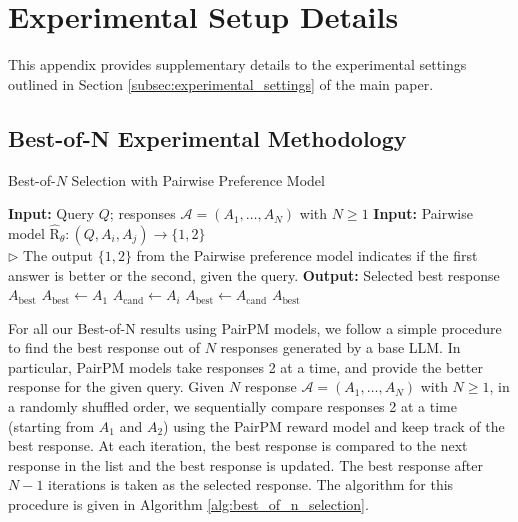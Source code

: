 \clearpage
\section{Experimental Setup Details}
\label{sec:experimental_details}

This appendix provides supplementary details to the experimental settings outlined in Section \ref{subsec:experimental_settings} of the main paper.

\subsection{Best-of-N Experimental Methodology}
\label{ssec:bon_pairpm_expt_methodology}

\begin{algorithm}[H]
  \caption{Best-of-$N$ Selection with Pairwise Preference Model}
  \label{alg:best_of_n_selection}
  \begin{algorithmic}[1]          %
    \STATE \textbf{Input:}  Query $Q$; responses $\mathcal{A} = (A_1,\dots,A_N)$ with $N \ge 1$
    \STATE \textbf{Input:}  Pairwise model $\hat{\mathrm{R}}_\theta : (Q,A_i,A_j) \to \{1,2\}$\\
    $\triangleright$ The output $\{1,2\}$ from the Pairwise preference model indicates if the first answer is better or the second, given the query.
    \STATE \textbf{Output:} Selected best response $A_{\text{best}}$
    \STATE $A_{\text{best}} \leftarrow A_1$
        \STATE $A_{\text{cand}} \leftarrow A_i$
            \STATE $A_{\text{best}} \leftarrow A_{\text{cand}}$
        \ENDIF
    \ENDFOR
    \RETURN $A_{\text{best}}$
  \end{algorithmic}
\end{algorithm}



For all our Best-of-N results using PairPM models, we follow a simple procedure to find the best response out of $N$ responses generated by a base LLM. In particular, PairPM models take responses 2 at a time, and provide the better response for the given query.
Given $N$ response $\mathcal{A} = (A_1,\dots,A_N)$ with $N \ge 1$, in a randomly shuffled order, we sequentially compare responses 2 at a time (starting from $A_1$ and $A_2$) using the PairPM reward model and keep track of the best response. At each iteration, the best response is compared to the next response in the list and the best response is updated. The best response after $N-1$ iterations is taken as the selected response.
The algorithm for this procedure is given in Algorithm \ref{alg:best_of_n_selection}.



